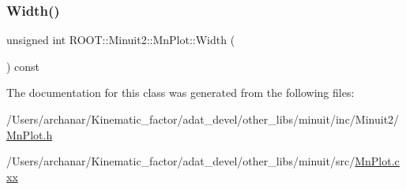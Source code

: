 \subsubsection{\texorpdfstring{Width()}{Width()}\hspace{0.1cm}{\footnotesize\ttfamily [2/2]}}
{\footnotesize\ttfamily unsigned int R\+O\+O\+T\+::\+Minuit2\+::\+Mn\+Plot\+::\+Width (\begin{DoxyParamCaption}{ }\end{DoxyParamCaption}) const\hspace{0.3cm}{\ttfamily [inline]}}



The documentation for this class was generated from the following files\+:\begin{DoxyCompactItemize}
\item 
/\+Users/archanar/\+Kinematic\+\_\+factor/adat\+\_\+devel/other\+\_\+libs/minuit/inc/\+Minuit2/\mbox{\hyperlink{other__libs_2minuit_2inc_2Minuit2_2MnPlot_8h}{Mn\+Plot.\+h}}\item 
/\+Users/archanar/\+Kinematic\+\_\+factor/adat\+\_\+devel/other\+\_\+libs/minuit/src/\mbox{\hyperlink{MnPlot_8cxx}{Mn\+Plot.\+cxx}}\end{DoxyCompactItemize}
